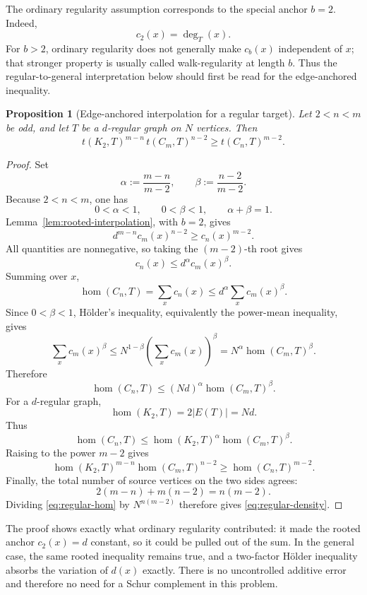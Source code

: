 \documentclass[11pt]{article}
\newtheorem{proposition}[theorem]{Proposition}
\newcommand{\homn}{\operatorname{hom}}
\newcommand{\1}{\mathbf{1}}
\begin{document}
The ordinary regularity assumption corresponds to the special anchor $b=2$.
Indeed,
\[
  c_2(x)=\deg_T(x).
\]
For $b>2$, ordinary regularity does not generally make $c_b(x)$ independent
of $x$; that stronger property is usually called walk-regularity at length
$b$.  Thus the regular-to-general interpretation below should first be read
for the edge-anchored inequality.

\begin{proposition}[Edge-anchored interpolation for a regular target]
\label{prop:regular-edge-anchor}
Let $2<n<m$ be odd, and let $T$ be a $d$-regular graph on $N$ vertices.  Then
\[
  t(K_2,T)^{m-n}\,t(C_m,T)^{n-2}
  \ge
  t(C_n,T)^{m-2}.
  \tag{4.1}\label{eq:regular-density}
\]
\end{proposition}

\begin{proof}
Set
\[
  \alpha:=\frac{m-n}{m-2},
  \qquad
  \beta:=\frac{n-2}{m-2}.
\]
Because $2<n<m$, one has
\[
  0<\alpha<1,
  \qquad
  0<\beta<1,
  \qquad
  \alpha+\beta=1.
\]
Lemma~\ref{lem:rooted-interpolation}, with $b=2$, gives
\[
  d^{m-n}c_m(x)^{n-2}\ge c_n(x)^{m-2}.
\]
All quantities are nonnegative, so taking the $(m-2)$-th root gives
\[
  c_n(x)\le d^\alpha c_m(x)^\beta.
\]
Summing over $x$,
\[
  \homn(C_n,T)
  =\sum_xc_n(x)
  \le d^\alpha\sum_x c_m(x)^\beta.
\]
Since $0<\beta<1$, H\"older's inequality, equivalently the power-mean
inequality, gives
\[
  \sum_xc_m(x)^\beta
  \le
  N^{1-\beta}\left(\sum_xc_m(x)\right)^\beta
  =N^\alpha\homn(C_m,T)^\beta.
\]
Therefore
\[
  \homn(C_n,T)
  \le
  (Nd)^\alpha\homn(C_m,T)^\beta.
\]
For a $d$-regular graph,
\[
  \homn(K_2,T)=2|E(T)|=Nd.
\]
Thus
\[
  \homn(C_n,T)
  \le
  \homn(K_2,T)^\alpha\homn(C_m,T)^\beta.
\]
Raising to the power $m-2$ gives
\[
  \homn(K_2,T)^{m-n}\homn(C_m,T)^{n-2}
  \ge
  \homn(C_n,T)^{m-2}.
  \tag{4.2}\label{eq:regular-hom}
\]
Finally, the total number of source vertices on the two sides agrees:
\[
  2(m-n)+m(n-2)=n(m-2).
\]
Dividing \eqref{eq:regular-hom} by $N^{n(m-2)}$ therefore gives
\eqref{eq:regular-density}.
\end{proof}

The proof shows exactly what ordinary regularity contributed: it made the
rooted anchor $c_2(x)=d$ constant, so it could be pulled out of the sum.  In
the general case, the same rooted inequality remains true, and a two-factor
H\"older inequality absorbs the variation of $d(x)$ exactly.  There is no
uncontrolled additive error and therefore no need for a Schur complement in
this problem.
\end{document}
